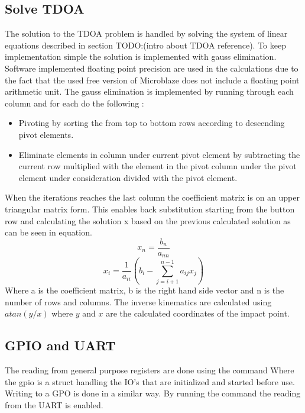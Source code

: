 \subsection{Solve TDOA}
The solution to the TDOA problem is handled by solving the system of linear equations described in section TODO:(intro about TDOA reference). To keep implementation simple the solution is implemented with gauss elimination. Software implemented floating point precision are used in the calculations due to the fact that the used free version of Microblaze does not include a floating point arithmetic unit. 
The gauss elimination is implemented by running through each column and for each do the following \cite{gauss}:
\begin{itemize}
	\item Pivoting by sorting the from top to bottom rows according to descending pivot elements.
	\item Eliminate elements in column under current pivot element by subtracting the current row multiplied with the element in the pivot column under the pivot element under consideration divided with the pivot element.
\end{itemize}
When the iterations reaches the last column the coefficient matrix is on an upper triangular matrix form. This enables back substitution starting from the button row and calculating the solution x based on the previous calculated solution as can be seen in equation.
\begin{equation}
	x_n = \frac{b_n}{a_{nn}}
\end{equation}
%
\begin{equation}
	x_i = \frac{1}{a_{ii}} (b_i - \sum_{j=i+1}^{n-1} a_{ij}x_j)
\end{equation}
Where a is the coefficient matrix, b is the right hand side vector and n is the number of rows and columns.
%
The inverse kinematics are calculated using $atan(y/x)$ where $y$ and $x$ are the calculated coordinates of the impact point. 
%
\subsection{GPIO and UART}
The reading from general purpose registers are done using the command
Where the gpio is a struct handling the IO's that are initialized and started before use.
Writing to a GPO is done in a similar way.
By running the command  the reading from the UART is enabled.

